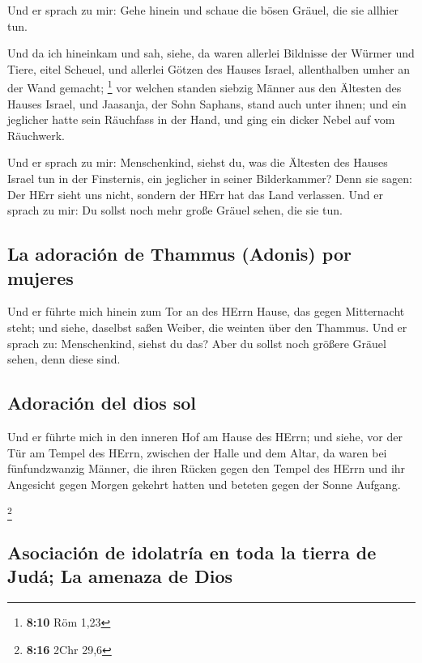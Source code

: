  Und er sprach zu mir: Gehe hinein und schaue die bösen
Gräuel, die sie allhier tun.

 Und da ich hineinkam und sah, siehe, da waren allerlei
Bildnisse der Würmer und Tiere, eitel Scheuel, und allerlei Götzen des
Hauses Israel, allenthalben umher an der Wand gemacht; \footnote{\textbf{8:10}
  Röm 1,23}  vor welchen standen siebzig Männer aus den
Ältesten des Hauses Israel, und Jaasanja, der Sohn Saphans, stand auch
unter ihnen; und ein jeglicher hatte sein Räuchfass in der Hand, und
ging ein dicker Nebel auf vom Räuchwerk.

 Und er sprach zu mir: Menschenkind, siehst du, was die
Ältesten des Hauses Israel tun in der Finsternis, ein jeglicher in
seiner Bilderkammer? Denn sie sagen: Der HErr sieht uns nicht, sondern
der HErr hat das Land verlassen.  Und er sprach zu mir:
Du sollst noch mehr große Gräuel sehen, die sie tun.

\hypertarget{la-adoraciuxf3n-de-thammus-adonis-por-mujeres}{%
\subsection{La adoración de Thammus (Adonis) por
mujeres}\label{la-adoraciuxf3n-de-thammus-adonis-por-mujeres}}

 Und er führte mich hinein zum Tor an des HErrn Hause,
das gegen Mitternacht steht; und siehe, daselbst saßen Weiber, die
weinten über den Thammus.  Und er sprach zu:
Menschenkind, siehst du das? Aber du sollst noch größere Gräuel sehen,
denn diese sind.

\hypertarget{adoraciuxf3n-del-dios-sol}{%
\subsection{Adoración del dios sol}\label{adoraciuxf3n-del-dios-sol}}

 Und er führte mich in den inneren Hof am Hause des
HErrn; und siehe, vor der Tür am Tempel des HErrn, zwischen der Halle
und dem Altar, da waren bei fünfundzwanzig Männer, die ihren Rücken
gegen den Tempel des HErrn und ihr Angesicht gegen Morgen gekehrt hatten
und beteten gegen der Sonne Aufgang.

\footnote{\textbf{8:16} 2Chr 29,6}

\hypertarget{asociaciuxf3n-de-idolatruxeda-en-toda-la-tierra-de-juduxe1-la-amenaza-de-dios}{%
\subsection{Asociación de idolatría en toda la tierra de Judá; La
amenaza de
Dios}\label{asociaciuxf3n-de-idolatruxeda-en-toda-la-tierra-de-juduxe1-la-amenaza-de-dios}}

